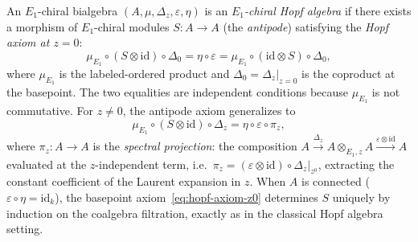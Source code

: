 \begin{definition}
\label{def:e1-chiral-antipode}
An $E_1$-chiral bialgebra $(A, \mu, \Delta_z, \varepsilon, \eta)$ is an
\emph{$E_1$-chiral Hopf algebra} if there exists a morphism of
$E_1$-chiral modules $S \colon A \to A$ (the \emph{antipode})
satisfying the \emph{Hopf axiom at $z = 0$}:
\begin{equation}\label{eq:hopf-axiom-z0}
 \mu_{E_1} \circ (S \otimes \mathrm{id}) \circ \Delta_0
 = \eta \circ \varepsilon
 = \mu_{E_1} \circ (\mathrm{id} \otimes S) \circ \Delta_0,
\end{equation}
where $\mu_{E_1}$ is the labeled-ordered product and $\Delta_0 = \Delta_z|_{z=0}$
is the coproduct at the basepoint. The two equalities are
independent conditions because $\mu_{E_1}$ is not commutative.
For $z \neq 0$, the antipode axiom generalizes to
\begin{equation}\label{eq:hopf-axiom-spectral}
 \mu_{E_1} \circ (S \otimes \mathrm{id}) \circ \Delta_z
 = \eta \circ \varepsilon \circ \pi_z,
\end{equation}
where $\pi_z \colon A \to A$ is the \emph{spectral projection}:
the composition $A \xrightarrow{\Delta_z} A \otimes_{E_1,z} A
\xrightarrow{\varepsilon \otimes \mathrm{id}} A$ evaluated at the
$z$-independent term, i.e.\ $\pi_z = (\varepsilon \otimes \mathrm{id})
\circ \Delta_z|_{z^0}$, extracting the constant coefficient of the
Laurent expansion in $z$. When $A$ is connected
($\varepsilon \circ \eta = \mathrm{id}_k$), the basepoint
axiom~\eqref{eq:hopf-axiom-z0} determines $S$ uniquely by
induction on the coalgebra filtration, exactly as in the classical
Hopf algebra setting.
\end{definition}

